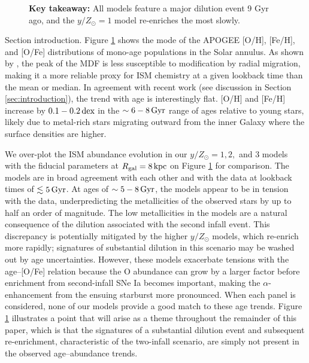 \documentclass[twocolumn,twocolappendix,linenumbers]{aastex631}
\newcommand{\todo}[1]{{\color{red}#1}}
\newcommand{\yZ}[1]{$y/Z_\odot=#1$}
\newcommand{\kpc}{\,{\rm kpc}}
\newcommand{\Gyr}{\,{\rm Gyr}}
\newcommand{\dex}{\,{\rm dex}}
\begin{document}
\begin{figure}
{    {\bf Key takeaway:} All models feature a major dilution event 9 Gyr ago, and the \yZ{1} model re-enriches the most slowly.}
    \label{fig:yield-outflow}
\end{figure}

\todo{Section introduction.} Figure \ref{fig:yield-outflow} shows the mode of the APOGEE [O/H], [Fe/H], and [O/Fe] distributions of mono-age populations in the Solar annulus. As shown by \citet{johnson_milky_2024}, the peak of the MDF is less susceptible to modification by radial migration, making it a more reliable proxy for ISM chemistry at a given lookback time than the mean or median. In agreement with recent work (see discussion in Section \ref{sec:introduction}), the trend with age is interestingly flat. [O/H] and [Fe/H] increase by $0.1-0.2\dex$ in the $\sim6-8\Gyr$ range of ages relative to young stars, likely due to metal-rich stars migrating outward from the inner Galaxy where the surface densities are higher.

We over-plot the ISM abundance evolution in our $y/Z_\odot=1,2,$ and $3$ models with the fiducial parameters at $R_{\rm gal}=8\kpc$ on Figure \ref{fig:yield-outflow} for comparison. The models are in broad agreement with each other and with the data at lookback times of $\lesssim5\Gyr$. At ages of $\sim5-8\Gyr$, the models appear to be in tension with the data, underpredicting the metallicities of the observed stars by up to half an order of magnitude. The low metallicities in the models are a natural consequence of the dilution associated with the second infall event. This discrepancy is potentially mitigated by the higher $y/Z_\odot$ models, which re-enrich more rapidly; signatures of substantial dilution in this scenario may be washed out by age uncertainties. However, these models exacerbate tensions with the age--[O/Fe] relation because the O abundance can grow by a larger factor before enrichment from second-infall SNe Ia becomes important, making the $\alpha$-enhancement from the ensuing starburst more pronounced. When each panel is considered, none of our models provide a good match to these age trends. Figure \ref{fig:yield-outflow} illustrates a point that will arise as a theme throughout the remainder of this paper, which is that the signatures of a substantial dilution event and subsequent re-enrichment, characteristic of the two-infall scenario, are simply not present in the observed age--abundance trends.
\end{document}
